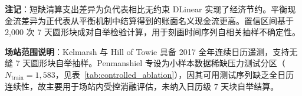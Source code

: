 \begin{table}[!t]
\begin{threeparttable}
\begin{tabularx}{\textwidth}{p{2.2cm}p{3.0cm}>{\centering\arraybackslash}X>{\centering\arraybackslash}X>{\centering\arraybackslash}X}
\bottomrule
\end{tabularx}
\begin{tablenotes}[flushleft]
\footnotesize
\item \textbf{注记}：短缺清算支出差异为负代表相比无约束 DLinear 实现了经济节约。平衡现金流差异为正代表从平衡机制中结算得到的账面名义现金流更高。置信区间基于 2,000 次 7 天圆形块成对自举检验计算，用于刻画时间序列自相关抽样不确定性。
\item \textbf{场站范围说明}：Kelmarsh 与 Hill of Towie 具备 2017 全年连续日历遥测，支持无缝 7 天圆形块自举抽样。Penmanshiel 专设为小样本数据稀缺压力测试分区（$N_{\text{train}}=1{,}583$，见表~\ref{tab:controlled_ablation}），因其可用测试序列缺乏全日历连续性，故主要用于场站内受控消融评估，未纳入日历级 7 天块自举结算。
\end{tablenotes}
\end{threeparttable}
\end{table}
